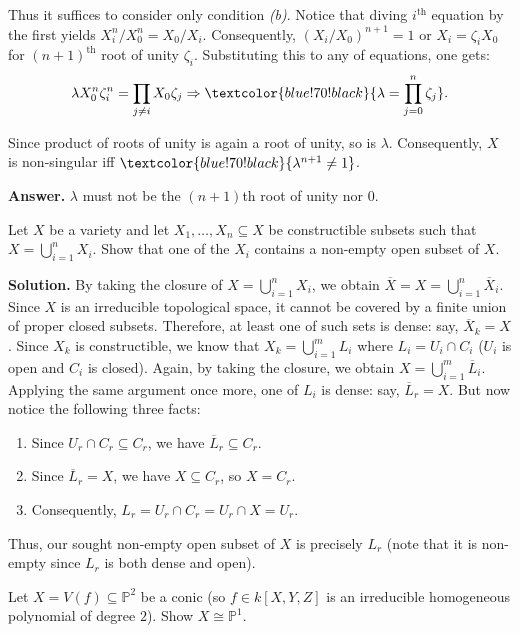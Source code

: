 \documentclass{template}
\begin{document}
Thus it suffices to consider only condition \textit{(b)}. Notice that diving
$i^{\text{th}}$ equation by the first yields $X_i^n/X_0^n = X_0/X_i$.
Consequently, $(X_i/X_0)^{n+1}=1$ or $X_i = \zeta_i X_0$ for $(n+1)^{\text{th}}$
root of unity $\zeta_i$. Substituting this to any of equations, one gets:
\begin{equation*}
    \lambda X_0^n\zeta_i^n = \prod_{j \neq i}X_0\zeta_j \Rightarrow \textcolor{blue!70!black}{\lambda = \prod_{j=0}^n \zeta_j}.
\end{equation*}

Since product of roots of unity is again a root of unity, so is $\lambda$.
Consequently, $X$ is non-singular iff $\textcolor{blue!70!black}{\lambda^{n+1}
\neq 1}$.

\textbf{Answer.} $\lambda$ must not be the $(n+1)$th root of unity nor $0$.

\begin{problem}[Exercise 3]
    Let $X$ be a variety and let $X_1,\dots,X_n \subseteq X$ be constructible 
    subsets such that $X = \bigcup_{i=1}^n X_i$. Show that one of the $X_i$
    contains a non-empty open subset of $X$.
\end{problem}

\textbf{Solution.} By taking the closure of $X=\bigcup_{i=1}^n X_i$, we obtain
$\overline{X}=X = \bigcup_{i=1}^n \overline{X}_i$. Since $X$ is an irreducible
topological space, it cannot be covered by a finite union of proper closed
subsets. Therefore, at least one of such sets is dense: say, $\overline{X}_k =
X$. Since $X_k$ is constructible, we know that $X_k = \bigcup_{i=1}^m L_i$ where
$L_i = U_i \cap C_i$ ($U_i$ is open and $C_i$ is closed). Again, by taking the
closure, we obtain $X = \bigcup_{i=1}^m \overline{L}_i$. Applying the same
argument once more, one of $L_i$ is dense: say, $\overline{L}_r=X$. But now
notice the following three facts:
\begin{enumerate}
    \item Since $U_r \cap C_r \subseteq C_r$, we have $\overline{L}_r \subseteq C_r$.
    \item Since $\overline{L}_r=X$, we have $X \subseteq C_r$, so $X=C_r$.
    \item Consequently, $L_r = U_r \cap C_r = U_r \cap X = U_r$.
\end{enumerate}

Thus, our sought non-empty open subset of $X$ is precisely $L_r$ (note that it
is non-empty since $L_r$ is both dense and open).

\begin{problem}[Exercise 4]
    Let $X=V(f) \subseteq \mathbb{P}^2$ be a conic (so $f \in k[X,Y,Z]$ is an 
    irreducible homogeneous polynomial of degree $2$). Show $X \cong \mathbb{P}^1$.
\end{problem}
\end{document}
